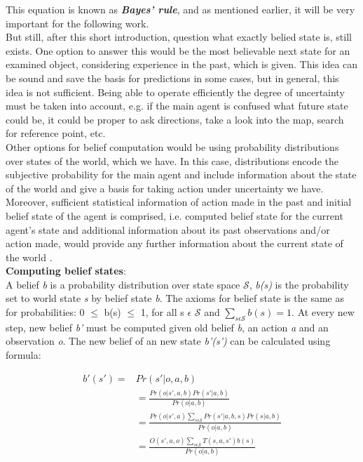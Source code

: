 This equation is known as \textbf{\textit{Bayes’ rule}}, and as mentioned earlier, it will be very important for the following work. \\
But still, after this short introduction, question what exactly belied state is, still exists. One option to answer this would be the most believable next state for an examined object, considering experience in the past, which is given. This idea can be sound and save the basis for predictions in some cases, but in general, this idea is not sufficient. Being able to operate efficiently the degree of uncertainty must be taken into account, e.g. if the main agent is confused what future state could be, it could be proper to ask directions, take a look into the map, search for reference point, etc. \\
Other options for belief computation would be using probability distributions over states of the world, which we have. In this case, distributions encode the subjective probability for the main agent and include information about the state of the world and give a basis for taking action under uncertainty we have.  Moreover, sufficient statistical information of action made in the past and initial belief state of the agent is comprised, i.e. computed belief state for the current agent’s state and additional information about its past observations and/or action made, would provide any further information about the current state of the world \cite{belief}. \\
\textbf{Computing belief states}\cite{belief}: \\
A belief \textit{b} is a probability distribution over state space $\mathscr{S}$, \textit{b(s)} is the probability set to world state \textit{s} by belief state \textit{b}. The axioms for belief state is the same as for probabilities: 0 $\leqslant$ b(s) $\leqslant$ 1, for all s $\epsilon$ $\mathscr{S}$ and $\sum_{s \epsilon \mathscr{S} } b(s) = 1.$ At every new step, new belief \textit{b'} must be  computed given old belief \textit{b}, an action \textit{a} and an observation \textit{o}. The new belief of an new state \textit{b'(s')} can be calculated using formula:

\begin{equation}
\begin{split}
b'(s') = & \displaystyle Pr(s'|o, a, b) \\ 
& = \displaystyle \frac{Pr(o|s', a, b) Pr(s'|a, b)}{Pr(o|a, b)} \\
& = \displaystyle \frac{Pr(o|s', a) \sum_{s \epsilon \mathscr{S}} Pr(s'|a, b, s) Pr(s|a, b)}{Pr(o|a, b)} \\
& = \displaystyle \frac{O(s', a, o) \sum_{s \epsilon \mathscr{S}} T(s, a, s') b(s)}{Pr(o|a, b) }
\end{split}
\end{equation}

